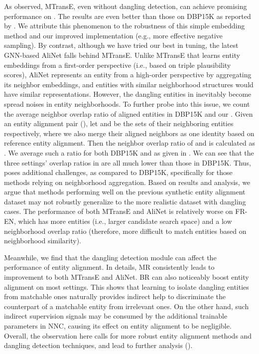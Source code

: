 As observed,
MTransE, even without dangling detection, can achieve promising performance on \dataset. 
The results are even better than those on DBP15K as reported by \citet{JAPE}.
We attribute this phenomenon to the robustness of this simple embedding method and our improved implementation (e.g., more effective negative sampling).
By contrast, although we have tried our best in tuning, the latest GNN-based AliNet falls behind MTransE.
Unlike MTransE that learns entity embeddings from a first-order perspective (i.e., based on triple plausibility scores), AliNet represents an entity from a high-order perspective by aggregating its neighbor embeddings, and entities with similar neighborhood structures would have similar representations.
However, the dangling entities in \dataset inevitably become spread noises in entity neighborhoods.
To further probe into this issue, we count the average neighbor overlap ratio of aligned entities in DBP15K and our \dataset. Given an entity alignment pair (), let  and  be the sets of their neighboring entities
respectively, where we also merge their aligned neighbors as one identity based on reference entity alignment. 
Then the neighbor overlap ratio of  and  is calculated as . 
We average such a ratio for both DBP15K and \dataset as given in .
We can see that the three settings' overlap ratios in \dataset are all much lower than those in DBP15K.
Thus, \dataset poses additional challenges, as compared to DBP15K, specifically for those methods relying on neighborhood aggregation.
Based on results and analysis, we argue that methods performing well on the previous synthetic entity alignment dataset may not robustly generalize to the more realistic dataset with dangling cases.
The performance of both MTransE and AliNet is relatively worse on FR-EN, 
which has more entities (i.e., larger candidate search space) and a low neighborhood overlap ratio (therefore, more difficult to match entities based on neighborhood similarity).

Meanwhile,
we find that the dangling detection module can affect the performance of entity alignment.
In details, MR consistently leads to  improvement to both MTransE and AliNet. 
BR can also noticeably boost entity alignment on most settings.
This shows that learning to isolate dangling entities from matchable ones naturally provides indirect help to discriminate the counterpart of a matchable entity from irrelevant ones.
On the other hand, such indirect supervision signals may be consumed by the additional trainable parameters in NNC, causing its effect on entity alignment to be negligible. 
Overall, the observation here calls for more robust entity alignment methods and dangling detection techniques, and lead to further analysis ().


